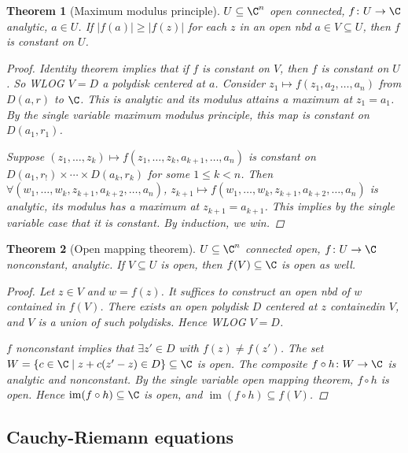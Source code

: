 \documentclass[A4paper, british]{amsart}
\theoremstyle{darkgreentheorem}
\newtheorem{thm}{Theorem}[section]
\theoremstyle{darkbluedefinition}
\theoremstyle{darkredexample}
\theoremstyle{remark}
\DeclareMathOperator{\im}{im}
\newcommand{\1}{\mathbbm{1}}
\begin{document}
\begin{thm}[Maximum modulus principle]
    $U\subseteq \C^{n}$ open connected, $f\colon U\to \C$ analytic, $a\in U$.
    If $|f(a)|\geqslant |f(z)|$ for each $z$ in an open nbd $a\in V\subseteq U$, then $f$ is constant on $U$.
    \begin{proof}
	Identity theorem implies that if $f$ is constant on $V$, then $f$ is constant on $U$.
	So WLOG $V=D$ a polydisk centered at $a$.
	Consider $z_{1}\mapsto f(z_{1},a_{2},\ldots,a_{n})$ from $D(a,r)$ to $\C$.
	This is analytic and its modulus attains a maximum at $z_{1}=a_{1}$.
	By the single variable maximum modulus principle, this map is constant on $D(a_{1},r_{1})$.
	
	Suppose $(z_{1},\ldots,z_{k})\mapsto f(z_{1},\ldots,z_{k},a_{k+1},\ldots,a_{n})$ is constant on $D(a_{1},r_{!})\times \cdots \times D(a_{k},r_{k})$ for some $1\leqslant k<n$.
	Then $\forall (w_{1},\ldots, w_{k},z_{k+1},a_{k+2},\ldots,a_{n})$, $z_{k+1}\mapsto f(w_{1},\ldots,w_{k},z_{k+1},a_{k+2},\ldots,a_{n})$ is analytic, its modulus has a maximum at $z_{k+1}=a_{k+1}$.
	This implies by the single variable case that it is constant.
	By induction, we win.
    \end{proof}
\end{thm}

\begin{thm}[Open mapping theorem]
    $U\subseteq \C^{n}$ connected open, $f\colon U\to \C$ nonconstant, analytic.
    If $V\subseteq U$ is open, then $f(V)\subseteq \C$ is open as well.
    \begin{proof}
	Let $z\in V$ and $w=f(z)$.
	It suffices to construct an open nbd of $w$ contained in $f(V)$.
	There exists an open polydisk $D$ centered at $z$ containedin $V$, and $V$ is a union of such polydisks.
	Hence WLOG $V=D$.

	$f$ nonconstant implies that $\exists z'\in D$ with $f(z)\neq f(z')$.
	The set $W=\{c\in \C\mid z+c(z'-z)\in D\}\subseteq \C $ is open.
	The composite $f\circ h\colon W\to \C$ is analytic and nonconstant.
	By the single variable open mapping theorem, $f\circ h$ is open.
	Hence $\im(f\circ h)\subseteq \C$ is open, and $\im(f\circ h)\subseteq f(V)$.
    \end{proof}
\end{thm}

\subsection{Cauchy-Riemann equations}
\end{document}
